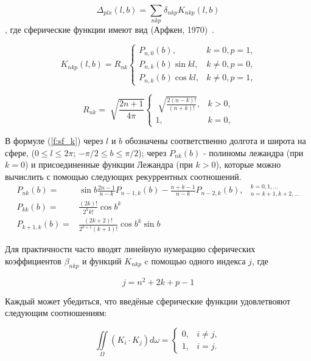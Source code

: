 \documentclass[14pt]{article} %
\begin{document}
$$ \Delta_{plx} (l,b) = \sum_{nkp}\delta_{nkp}K_{nkp}(l,b) $$,
где сферические функции имеют вид (Арфкен, 1970)~\cite{book:arfken}.

\begin{equation}\label{f:sf_k}
K_{nkp}(l,b) = R_{nk} \left\{ \begin{array}{ll}
P_{n,0}(b), & \textrm{$k=0, p=1$,}\\
P_{n,k}(b)\sin{kl}, & \textrm{$k\neq0, p=0$,}\\
P_{n,k}(b)\cos{kl}, & \textrm{$k\neq0, p=1$,}
\end{array} \right.
\end{equation}

\begin{equation}
R_{nk} = \sqrt[]{\frac{2n+1}{4\pi}} \left\{ \begin{array}{cc}
\sqrt[]{\frac{2(n-k)!}{(n+k)!}}, & \textrm{$k>0$,}\\
1, & \textrm{$k=0$,}
\end{array} \right.
\end{equation}

В формуле (\ref{f:sf_k}) через $l$ и $b$ обозначены соответственно долгота и широта на сфере, ($0 \leq l \leq 2\pi$; $-\pi/2\leq b \leq \pi/2$); через $P_{nk}(b)$ - полиномы лежандра (при $k = 0$) и присоединенные функции Лежандра (при $k > 0$), которые можно вычислить с помощью следующих рекуррентных соотношений. 
\begin{equation}
\begin{array}{rll}
P_{nk}(b)=&\sin{b\frac{2n-1}{n-k}}P_{n-1,k}(b)-\frac{n+k-1}{n-k}P_{n-2,k}(b), & {}^{k=0,1,...}_{n=k+1,k+2,...}\\
P_{kk}(b)=&\frac{(2k)!}{2^{k}k!}{\cos{b}}^{k}\\
P_{k+1,k}(b)=&\frac{(2k+2)!}{2^{k+1}(k+1)!}{\cos{b}}^{k}\sin{b}
\end{array}
\end{equation}

Для практичности часто вводят линейную нумерацию  сферических коэффициентов $\beta_{nkp}$ и функций $K_{nkp}$ c помощью одного индекса $j$, где

\begin{equation}\label{f:sf_j}
j = n^2 + 2k + p -1
\end{equation}

Каждый может убедиться, что введёные сферические функции удовлетвояют следующим соотношениям:

\begin{equation}
\iint\limits_\Omega \left(K_i \cdot K_j \right) d\omega =  \left\{ \begin{array}{cc}
0, & i \neq j,\\
1, & i = j.
\end{array} \right.
\end{equation}
\end{document}

